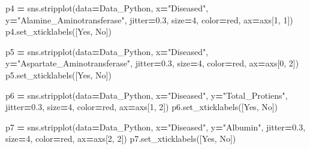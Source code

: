 \documentclass[
  11pt,
  a4paper,
]{article}
\newenvironment{Shaded}{\begin{snugshade}}{\end{snugshade}}
\newcommand{\DecValTok}[1]{\textcolor[rgb]{0.00,0.00,0.81}{#1}}
\newcommand{\FloatTok}[1]{\textcolor[rgb]{0.00,0.00,0.81}{#1}}
\newcommand{\NormalTok}[1]{#1}
\newcommand{\OperatorTok}[1]{\textcolor[rgb]{0.81,0.36,0.00}{\textbf{#1}}}
\newcommand{\StringTok}[1]{\textcolor[rgb]{0.31,0.60,0.02}{#1}}
\begin{document}
\begin{Shaded}
\begin{Highlighting}[]
\NormalTok{p4 }\OperatorTok{=}\NormalTok{ sns.stripplot(data}\OperatorTok{=}\NormalTok{Data\_Python, x}\OperatorTok{=}\StringTok{"Diseased"}\NormalTok{, y}\OperatorTok{=}\StringTok{"Alamine\_Aminotransferase"}\NormalTok{, jitter}\OperatorTok{=}\FloatTok{0.3}\NormalTok{, size}\OperatorTok{=}\DecValTok{4}\NormalTok{, color}\OperatorTok{=}\StringTok{\textquotesingle{}red\textquotesingle{}}\NormalTok{, ax}\OperatorTok{=}\NormalTok{axs[}\DecValTok{1}\NormalTok{, }\DecValTok{1}\NormalTok{])}
\NormalTok{p4.set\_xticklabels([}\StringTok{\textquotesingle{}Yes\textquotesingle{}}\NormalTok{, }\StringTok{\textquotesingle{}No\textquotesingle{}}\NormalTok{])}

\NormalTok{p5 }\OperatorTok{=}\NormalTok{ sns.stripplot(data}\OperatorTok{=}\NormalTok{Data\_Python, x}\OperatorTok{=}\StringTok{"Diseased"}\NormalTok{, y}\OperatorTok{=}\StringTok{"Aspartate\_Aminotransferase"}\NormalTok{, jitter}\OperatorTok{=}\FloatTok{0.3}\NormalTok{, size}\OperatorTok{=}\DecValTok{4}\NormalTok{, color}\OperatorTok{=}\StringTok{\textquotesingle{}red\textquotesingle{}}\NormalTok{, ax}\OperatorTok{=}\NormalTok{axs[}\DecValTok{0}\NormalTok{, }\DecValTok{2}\NormalTok{])}
\NormalTok{p5.set\_xticklabels([}\StringTok{\textquotesingle{}Yes\textquotesingle{}}\NormalTok{, }\StringTok{\textquotesingle{}No\textquotesingle{}}\NormalTok{])}

\NormalTok{p6 }\OperatorTok{=}\NormalTok{ sns.stripplot(data}\OperatorTok{=}\NormalTok{Data\_Python, x}\OperatorTok{=}\StringTok{"Diseased"}\NormalTok{, y}\OperatorTok{=}\StringTok{"Total\_Protiens"}\NormalTok{, jitter}\OperatorTok{=}\FloatTok{0.3}\NormalTok{, size}\OperatorTok{=}\DecValTok{4}\NormalTok{, color}\OperatorTok{=}\StringTok{\textquotesingle{}red\textquotesingle{}}\NormalTok{, ax}\OperatorTok{=}\NormalTok{axs[}\DecValTok{1}\NormalTok{, }\DecValTok{2}\NormalTok{])}
\NormalTok{p6.set\_xticklabels([}\StringTok{\textquotesingle{}Yes\textquotesingle{}}\NormalTok{, }\StringTok{\textquotesingle{}No\textquotesingle{}}\NormalTok{])}

\NormalTok{p7 }\OperatorTok{=}\NormalTok{ sns.stripplot(data}\OperatorTok{=}\NormalTok{Data\_Python, x}\OperatorTok{=}\StringTok{"Diseased"}\NormalTok{, y}\OperatorTok{=}\StringTok{"Albumin"}\NormalTok{, jitter}\OperatorTok{=}\FloatTok{0.3}\NormalTok{, size}\OperatorTok{=}\DecValTok{4}\NormalTok{, color}\OperatorTok{=}\StringTok{\textquotesingle{}red\textquotesingle{}}\NormalTok{, ax}\OperatorTok{=}\NormalTok{axs[}\DecValTok{2}\NormalTok{, }\DecValTok{2}\NormalTok{])}
\NormalTok{p7.set\_xticklabels([}\StringTok{\textquotesingle{}Yes\textquotesingle{}}\NormalTok{, }\StringTok{\textquotesingle{}No\textquotesingle{}}\NormalTok{])}


\end{Highlighting}
\end{Shaded}
\end{document}
